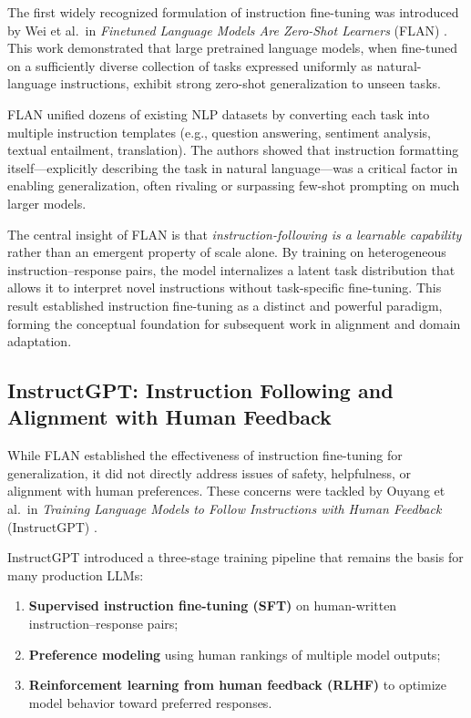 \documentclass[unnumsec,webpdf,contemporary,large]{oup-authoring-template}
\theoremstyle{thmstyleone}
\theoremstyle{thmstyletwo}
\theoremstyle{thmstylethree}
\begin{document}
The first widely recognized formulation of instruction fine-tuning was introduced by Wei et al.\ in \emph{Finetuned Language Models Are Zero-Shot Learners} (FLAN) \cite{wei2022flan}. This work demonstrated that large pretrained language models, when fine-tuned on a sufficiently diverse collection of tasks expressed uniformly as natural-language instructions, exhibit strong zero-shot generalization to unseen tasks.

FLAN unified dozens of existing NLP datasets by converting each task into multiple instruction templates (e.g., question answering, sentiment analysis, textual entailment, translation). The authors showed that instruction formatting itself---explicitly describing the task in natural language---was a critical factor in enabling generalization, often rivaling or surpassing few-shot prompting on much larger models.

The central insight of FLAN is that \emph{instruction-following is a learnable capability} rather than an emergent property of scale alone. By training on heterogeneous instruction--response pairs, the model internalizes a latent task distribution that allows it to interpret novel instructions without task-specific fine-tuning. This result established instruction fine-tuning as a distinct and powerful paradigm, forming the conceptual foundation for subsequent work in alignment and domain adaptation.

\subsection{InstructGPT: Instruction Following and Alignment with Human Feedback}

While FLAN established the effectiveness of instruction fine-tuning for generalization, it did not directly address issues of safety, helpfulness, or alignment with human preferences. These concerns were tackled by Ouyang et al.\ in \emph{Training Language Models to Follow Instructions with Human Feedback} (InstructGPT) \cite{ouyang2022instructgpt}.

InstructGPT introduced a three-stage training pipeline that remains the basis for many production LLMs:
\begin{enumerate}
  \item \textbf{Supervised instruction fine-tuning (SFT)} on human-written instruction--response pairs;
  \item \textbf{Preference modeling} using human rankings of multiple model outputs;
  \item \textbf{Reinforcement learning from human feedback (RLHF)} to optimize model behavior toward preferred responses.
\end{enumerate}
\end{document}

